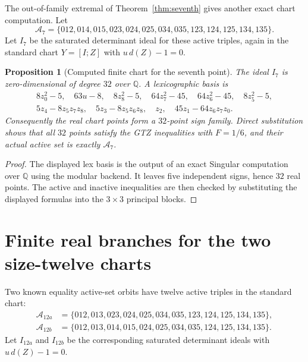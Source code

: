 \documentclass[11pt]{article}
\numberwithin{equation}{section}
\newtheorem{proposition}[theorem]{Proposition}
\theoremstyle{definition}
\newcommand{\cA}{\mathcal A}
\begin{document}
The out-of-family extremal of Theorem~\ref{thm:seventh} gives another exact
chart computation.  Let
\[
  \cA_7=\{012,014,015,023,024,025,034,035,123,124,125,134,135\}.
\]
Let $I_7$ be the saturated determinant ideal for these active triples, again in
the standard chart $Y=[I;Z]$ with $u\,d(Z)-1=0$.

\begin{proposition}[Computed finite chart for the seventh point]
The ideal $I_7$ is zero-dimensional of degree $32$ over $\mathbb Q$.  A
lexicographic basis is
\[
\begin{gathered}
8z_0^2-5,\quad 63u-8,\quad 8z_8^2-5,\quad
64z_7^2-45,\quad 64z_6^2-45,\quad 8z_5^2-5,\\
5z_4-8z_5z_7z_8,\quad
5z_3-8z_5z_6z_8,\quad z_2,\quad
45z_1-64z_6z_7z_0 .
\end{gathered}
\]
Consequently the real chart points form a $32$-point sign family.  Direct
substitution shows that all $32$ points satisfy the GTZ inequalities with
$F=1/6$, and their actual active set is exactly $\cA_7$.
\end{proposition}

\begin{proof}
The displayed lex basis is the output of an exact Singular computation over
$\mathbb Q$ using the modular backend.  It leaves five independent signs, hence
$32$ real points.  The active and inactive inequalities are then checked by
substituting the displayed formulas into the $3\times3$ principal blocks.
\end{proof}

\section{Finite real branches for the two size-twelve charts}
\label{sec:size-twelve-charts}

Two known equality active-set orbits have twelve active triples in the standard
chart:
\[
\begin{aligned}
  \cA_{12a}
    &=\{012,013,023,024,025,034,035,123,124,125,134,135\},\\
  \cA_{12b}
    &=\{012,013,014,015,024,025,034,035,124,125,134,135\}.
\end{aligned}
\]
Let $I_{12a}$ and $I_{12b}$ be the corresponding saturated determinant ideals
with $u\,d(Z)-1=0$.
\end{document}
